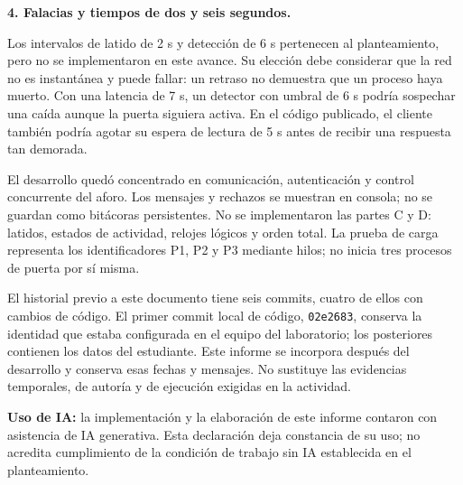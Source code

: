 \documentclass[11pt,a4paper]{article}
\newcommand{\apartado}[1]{\par\vspace{4pt}{\large\bfseries\color{verde}#1}\par\vspace{2pt}}
\begin{document}
\textbf{4. Falacias y tiempos de dos y seis segundos.}\par
Los intervalos de latido de 2 s y detección de 6 s pertenecen al planteamiento, pero no se implementaron en este avance. Su elección debe considerar que la red no es instantánea y puede fallar: un retraso no demuestra que un proceso haya muerto. Con una latencia de 7 s, un detector con umbral de 6 s podría sospechar una caída aunque la puerta siguiera activa. En el código publicado, el cliente también podría agotar su espera de lectura de 5 s antes de recibir una respuesta tan demorada.

\apartado{5. Limitaciones y trazabilidad}
El desarrollo quedó concentrado en comunicación, autenticación y control concurrente del aforo. Los mensajes y rechazos se muestran en consola; no se guardan como bitácoras persistentes. No se implementaron las partes C y D: latidos, estados de actividad, relojes lógicos y orden total. La prueba de carga representa los identificadores P1, P2 y P3 mediante hilos; no inicia tres procesos de puerta por sí misma.

El historial previo a este documento tiene seis commits, cuatro de ellos con cambios de código. El primer commit local de código, \texttt{02e2683}, conserva la identidad que estaba configurada en el equipo del laboratorio; los posteriores contienen los datos del estudiante. Este informe se incorpora después del desarrollo y conserva esas fechas y mensajes. No sustituye las evidencias temporales, de autoría y de ejecución exigidas en la actividad.

\textbf{Uso de IA:} la implementación y la elaboración de este informe contaron con asistencia de IA generativa. Esta declaración deja constancia de su uso; no acredita cumplimiento de la condición de trabajo sin IA establecida en el planteamiento.
\end{document}
